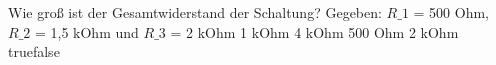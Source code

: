     {Wie groß ist der Gesamtwiderstand der Schaltung? Gegeben: $R\_1$ = 500 Ohm, $R\_2$ = 1,5 kOhm und $R\_3$ = 2 kOhm}
    {1 kOhm}
    {4 kOhm}
    {500 Ohm}
    {2 kOhm}
    {true}{false}